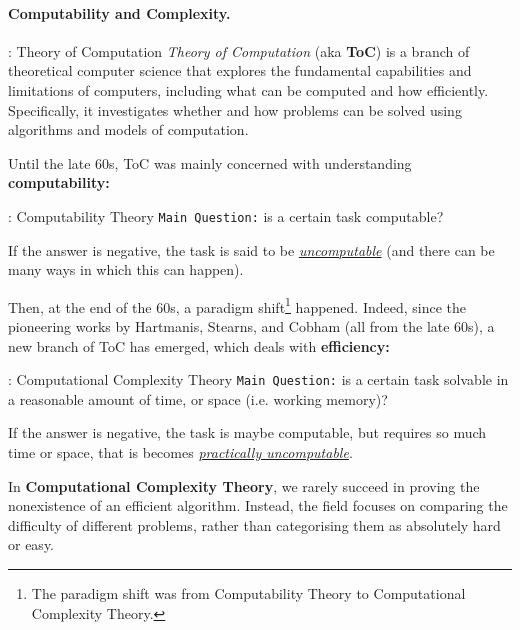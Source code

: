 \documentclass{article}
\begin{document}
			\paragraph{\large Computability and Complexity.}
			\mbox{}
			\begin{definition}{: Theory of Computation}
				\textit{Theory of Computation} (aka \textbf{ToC}) is a branch of theoretical computer science that explores the fundamental capabilities and limitations of computers, including what can be computed and how efficiently. Specifically, it investigates whether and how problems can be solved using algorithms and models of computation.
			\end{definition}
			Until the late 60s, ToC was mainly concerned with understanding \textbf{computability:}
			\begin{definition}{: Computability Theory}
				\texttt{Main Question:} is a certain task computable?
				\vspace{0.2cm}
				
				If the answer is negative, the task is said to be \uline{\textit{uncomputable}} (and there can be many ways in which this can happen).
			\end{definition}
			\vspace{0.1cm}
			
			Then, at the end of the 60s, a paradigm shift\footnote{The paradigm shift was from Computability Theory to Computational Complexity Theory.} happened. Indeed, since the pioneering works by Hartmanis, Stearns, and Cobham (all from the late 60s), a new branch of ToC has emerged, which deals with \textbf{efficiency:}
			\begin{definition}{: Computational Complexity Theory}
				\texttt{Main Question:} is a certain task solvable in a reasonable amount of time, or space (i.e. working memory)?
				\vspace{0.2cm}
				
				If the answer is negative, the task is maybe computable, but requires so much time or space, that is becomes \uline{\textit{practically uncomputable}}.
			\end{definition}
			In \textbf{Computational Complexity Theory}, we rarely succeed in proving the nonexistence of an efficient algorithm. Instead, the field focuses on comparing the difficulty of different problems, rather than categorising them as absolutely hard or easy.
			\vspace{0.15cm}
			
\end{document}
